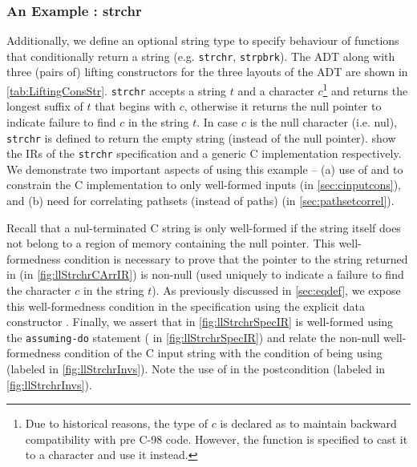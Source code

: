 \subsubsection{An Example : strchr}
\label{sec:strchrexample}
Additionally, we define an optional string type  to specify
behaviour of functions that conditionally return a string (e.g. {\tt strchr}, {\tt strpbrk}).
The  ADT along with three (pairs of) lifting constructors for the three layouts of the  ADT
are shown in \cref{tab:LiftingConsStr}.
{\tt strchr} accepts a string $t$ and a character $c$\footnote{Due to historical reasons,
the type of $c$ is declared as 
to maintain backward compatibility with pre C-98 code.
However, the function is specified to cast it to a character and use it instead.} and returns
the longest suffix of $t$ that begins with $c$, otherwise it returns the null pointer to indicate
failure to find $c$ in the string $t$.
In case $c$ is the null character (i.e. nul), {\tt strchr} is defined to return the empty string (instead of the null pointer).
 show the IRs of the {\tt strchr} specification and
a generic C implementation respectively.
We demonstrate two important aspects of \toolName{} using this example -- (a) use of \sdef{} and \pre{} to constrain the C implementation
to only well-formed inputs (in \cref{sec:cinputcons}),
and (b) need for correlating pathsets (instead of paths) (in \cref{sec:pathsetcorrel}).

Recall that a nul-terminated C string is only well-formed if the string itself does not belong to a region of memory containing the null pointer.
This well-formedness condition is necessary to prove that the pointer to the string returned in  (in \cref{fig:llStrchrCArrIR})
is non-null (used uniquely to indicate a failure to find the character $c$ in the string $t$).
As previously discussed in \cref{sec:eqdef}, we expose this well-formedness condition in the specification using
the explicit  data constructor .
Finally, we assert that  in \cref{fig:llStrchrSpecIR} is well-formed using the {\tt assuming-do} statement
( in \cref{fig:llStrchrSpecIR}) and relate the non-null well-formedness condition of the C input string 
with the condition of  being  using \pre{} (labeled  in \cref{fig:llStrchrInvs}).
Note the use of  in the postcondition (labeled  in \cref{fig:llStrchrInvs}).

